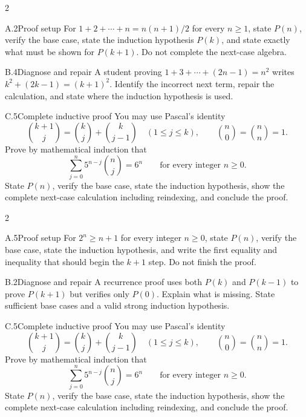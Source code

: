 \documentclass[9pt]{extarticle}
\begin{document}
\CoreWorkArea
\FormBreak
{}
\begin{multicols}{2}
\begin{CompactCoreProblem}{A.2}{Proof setup}
For $1+2+\cdots+n=n(n+1)/2$ for every $n\ge1$, state $P(n)$, verify the base case, state the induction hypothesis $P(k)$, and state exactly what must be shown for $P(k+1)$. Do not complete the next-case algebra.
\end{CompactCoreProblem}
\begin{CompactCoreProblem}{B.4}{Diagnose and repair}
A student proving $1+3+\cdots+(2n-1)=n^2$ writes $k^2+(2k-1)=(k+1)^2$. Identify the incorrect next term, repair the calculation, and state where the induction hypothesis is used.
\end{CompactCoreProblem}
\end{multicols}
\begin{CompactCoreProblem}{C.5}{Complete inductive proof}
You may use Pascal's identity
\[
\binom{k+1}{j}=\binom{k}{j}+\binom{k}{j-1}
\quad(1\le j\le k),\qquad
\binom{n}{0}=\binom{n}{n}=1.
\]
Prove by mathematical induction that
\[
\sum_{j=0}^{n} 5^{n-j}\binom{n}{j}=6^n\qquad\text{for every integer }n\ge0.
\]
State $P(n)$, verify the base case, state the induction hypothesis, show the complete next-case calculation including reindexing, and conclude the proof.
\end{CompactCoreProblem}
\CoreWorkArea
\FormBreak
{}
\begin{multicols}{2}
\begin{CompactCoreProblem}{A.5}{Proof setup}
For $2^n\ge n+1$ for every integer $n\ge0$, state $P(n)$, verify the base case, state the induction hypothesis, and write the first equality and inequality that should begin the $k+1$ step. Do not finish the proof.
\end{CompactCoreProblem}
\begin{CompactCoreProblem}{B.2}{Diagnose and repair}
A recurrence proof uses both $P(k)$ and $P(k-1)$ to prove $P(k+1)$ but verifies only $P(0)$. Explain what is missing. State sufficient base cases and a valid strong induction hypothesis.
\end{CompactCoreProblem}
\end{multicols}
\begin{CompactCoreProblem}{C.5}{Complete inductive proof}
You may use Pascal's identity
\[
\binom{k+1}{j}=\binom{k}{j}+\binom{k}{j-1}
\quad(1\le j\le k),\qquad
\binom{n}{0}=\binom{n}{n}=1.
\]
Prove by mathematical induction that
\[
\sum_{j=0}^{n} 5^{n-j}\binom{n}{j}=6^n\qquad\text{for every integer }n\ge0.
\]
State $P(n)$, verify the base case, state the induction hypothesis, show the complete next-case calculation including reindexing, and conclude the proof.
\end{CompactCoreProblem}
\end{document}
